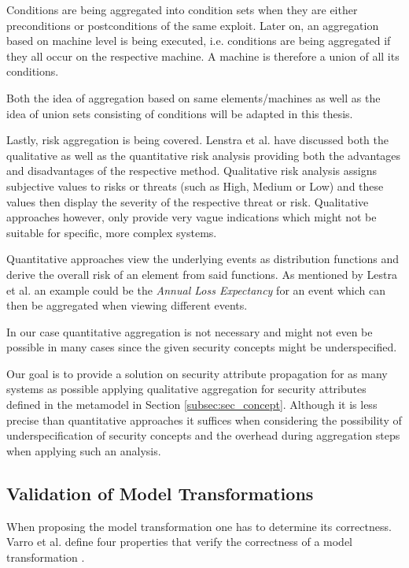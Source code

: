 Conditions are being aggregated into condition sets when they are either preconditions or postconditions of the same exploit. Later on, an aggregation based on machine level is being executed, i.e. conditions are being aggregated if they all occur on the respective machine. A machine is therefore a union of all its conditions. 

Both the idea of aggregation based on same elements/machines as well as the idea of union sets consisting of conditions will be adapted in this thesis.

Lastly, risk aggregation is being covered. Lenstra et al. \cite{Lenstra2004}  have discussed both the qualitative as well as the quantitative risk analysis providing both the advantages and disadvantages of the respective method. Qualitative risk analysis assigns subjective values to risks or threats (such as High, Medium or Low) and these values then display the severity of the respective threat or risk. Qualitative approaches however, only provide very vague indications which might not be suitable for specific, more complex systems. 

Quantitative approaches view the underlying events as distribution functions and derive the overall risk of an element from said functions. As mentioned by Lestra et al. an example could be the \textit{Annual Loss Expectancy} for an event which can then be aggregated when viewing different events.

In our case quantitative aggregation is not necessary and might not even be possible in many cases since the given security concepts might be underspecified. 

Our goal is to provide a solution on security attribute propagation for as many systems as possible applying qualitative aggregation for security attributes defined in the metamodel in Section \ref{subsec:sec_concept}. Although it is less precise than quantitative approaches \cite{Lenstra2004} it suffices when considering the possibility of underspecification of security concepts and the overhead during aggregation steps when applying such an analysis.

\subsection{Validation of Model Transformations}

When proposing the model transformation one has to determine its correctness. Varro et al. define four properties that verify the correctness of a model transformation \cite{vacca2012computer}.

